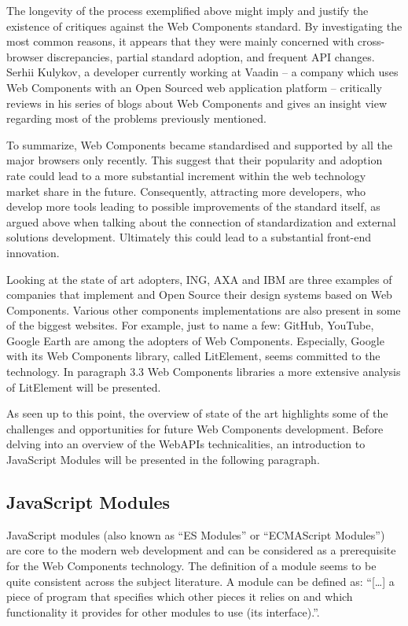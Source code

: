 The longevity of the process exemplified above might imply and justify the existence of critiques against the Web Components standard. By investigating the most common reasons, it appears that they were mainly concerned with cross-browser discrepancies, partial standard adoption, and frequent API changes. Serhii Kulykov, a developer currently working at Vaadin – a company which uses Web Components with an Open Sourced web application platform – critically reviews in his series of blogs  about Web Components and gives an insight view regarding most of the problems previously mentioned.

To summarize, Web Components became standardised and supported by all the major browsers only recently. This suggest that their popularity and adoption rate could lead to a more substantial increment within the web technology market share in the future. Consequently, attracting more developers, who develop more tools leading to possible improvements of the standard itself, as argued above when talking about the connection of standardization and external solutions development. Ultimately this could lead to a substantial front-end innovation.

Looking at the state of art adopters, ING, AXA and IBM are three examples of companies that implement and Open Source their design systems based on Web Components. Various other components implementations are also present in some of the biggest websites. For example, just to name a few: GitHub, YouTube, Google Earth are among the adopters of Web Components. Especially, Google with its Web Components library, called LitElement, seems committed to the technology. In paragraph 3.3 Web Components libraries a more extensive analysis of LitElement will be presented.

As seen up to this point, the overview of state of the art highlights some of the challenges and opportunities for future Web Components development. Before delving into an overview of the WebAPIs technicalities, an introduction to JavaScript Modules will be presented in the following paragraph.

\subsection{JavaScript Modules}
\label{subsec:jSModules}

JavaScript modules (also known as “ES Modules” or “ECMAScript Modules”) are core to the modern web development and can be considered as a prerequisite for the Web Components technology. The definition of a module seems to be quite consistent across the subject literature. A module can be defined as: “[…] a piece of program that specifies which other pieces it relies on and which functionality it provides for other modules to use (its interface).”.

